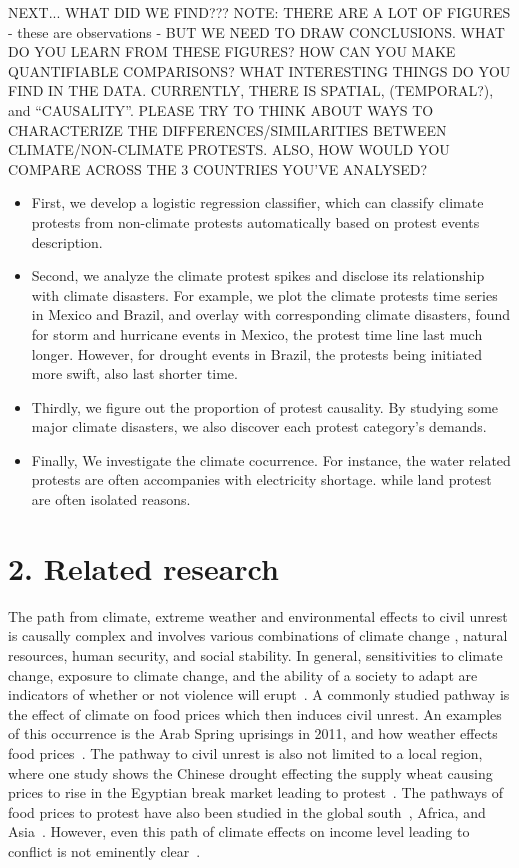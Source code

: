 \documentclass[9pt,twocolumn,twoside]{pnas-new}
\begin{document}
NEXT... WHAT DID WE FIND???
{\color{red}
NOTE: THERE ARE A LOT OF FIGURES - these are observations - BUT WE NEED TO DRAW CONCLUSIONS. WHAT DO YOU LEARN FROM THESE FIGURES? HOW CAN YOU MAKE QUANTIFIABLE COMPARISONS? WHAT INTERESTING THINGS DO YOU FIND IN THE DATA. CURRENTLY, THERE IS SPATIAL, (TEMPORAL?), and ``CAUSALITY''. PLEASE TRY TO THINK ABOUT WAYS TO CHARACTERIZE THE DIFFERENCES/SIMILARITIES BETWEEN CLIMATE/NON-CLIMATE PROTESTS. ALSO, HOW WOULD YOU COMPARE ACROSS THE 3 COUNTRIES YOU'VE ANALYSED?}

\begin{itemize}
  \item First, we develop a logistic regression classifier, which can classify climate protests from non-climate protests automatically based on protest events description.
  \item Second, we analyze the climate protest spikes and disclose its relationship with climate disasters. For example, we plot the climate protests time series in Mexico and Brazil, and overlay with corresponding climate disasters, found for storm and hurricane events in Mexico, the protest time line last much longer. However, for drought events in Brazil, the protests being initiated more swift, also last shorter time.
  \item Thirdly, we figure out the proportion of protest causality. By studying some major climate disasters, we also discover each protest category's demands.
  \item Finally, We investigate the climate cocurrence. For instance, the water related protests are often accompanies with electricity shortage. 
while land protest are often isolated reasons. 
\end{itemize}
%

%

%
%
\section{2. Related research}
The path from climate, extreme weather and environmental effects to civil unrest is causally complex \cite{hsiang2011civil,RW5} and involves various combinations of climate change \cite{burke2014climate}, natural resources, human security, and social stability.
In general, sensitivities to climate change, exposure to climate change, and the ability of a society to adapt are indicators of whether or not violence will erupt~\cite{RW9}.
A commonly studied pathway is the effect of climate on food prices which then induces civil unrest.
An examples of this occurrence is the Arab Spring uprisings in 2011, and how weather effects food prices~\cite{RW2}.
The pathway to civil unrest is also not limited to a local region, where one study shows the Chinese drought effecting the supply wheat causing prices to rise in the Egyptian break market leading to protest~\cite{RW1}.
The pathways of food prices to protest have also been studied in the global south~\cite{RW4}, Africa, and Asia~\cite{wischnath2014climate,RW6}.
However, even this path of climate effects on income level leading to conflict is not eminently clear~\cite{RW10}.
\end{document}
